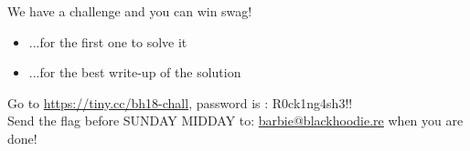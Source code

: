 We have a challenge and you can win swag!
\begin{itemize}
\item ...for the first one to solve it
\item ...for the best write-up of the solution
\end{itemize}

Go to \href{https://tiny.cc/bh18-chall}{https://tiny.cc/bh18-chall}, password is : R0ck1ng4sh3!!\\

Send the flag before SUNDAY MIDDAY to: \href{mailto:barbie@blackhoodie.re}{barbie@blackhoodie.re} when you are done!
